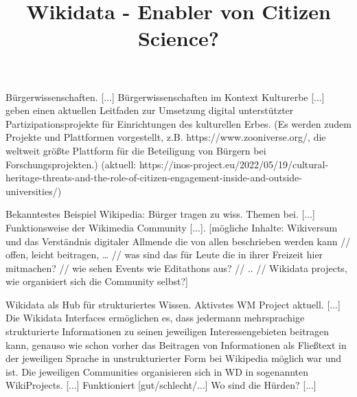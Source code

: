 \documentclass{article}
\begin{document}
\title{Wikidata - Enabler von Citizen Science?}

\maketitle





Bürgerwissenschaften. [...] Bürgerwissenschaften im Kontext Kulturerbe [...] \autocite{ridge_collective_2021} geben einen aktuellen Leitfaden zur Umsetzung digital unterstützter Partizipationsprojekte für Einrichtungen des kulturellen Erbes. (Es werden zudem Projekte und Plattformen vorgestellt, z.B. https://www.zooniverse.org/, die weltweit größte Plattform für die Beteiligung von Bürgern bei Forschungsprojekten.) (aktuell: https://inos-project.eu/2022/05/19/cultural-heritage-threats-and-the-role-of-citizen-engagement-inside-and-outside-universities/)


Bekanntestes Beispiel Wikipedia: Bürger tragen zu wiss. Themen bei. [...] Funktionsweise der Wikimedia Community [...]. [mögliche Inhalte: Wikiversum und das Verständnis digitaler Allmende die von allen beschrieben werden kann // offen, leicht beitragen, … // was sind das für Leute die in ihrer Freizeit hier mitmachen? // wie sehen Events wie Editathons aus? // .. // Wikidata projects, wie organisiert sich die Community selbst?]


Wikidata als Hub für strukturiertes Wissen. Aktivstes WM Project aktuell. [...] Die Wikidata Interfaces ermöglichen es, dass jedermann mehrsprachige strukturierte Informationen zu seinen jeweiligen Interessengebieten beitragen kann, genauso wie schon vorher das Beitragen von Informationen als Fließtext in der jeweiligen Sprache in unstrukturierter Form bei Wikipedia möglich war und ist. Die jeweiligen Communities organisieren sich in WD in sogenannten WikiProjects. [...] Funktioniert [gut/schlecht/...] Wo sind die Hürden? [...]





\printbibliography[title={Literaturverzeichnis}]
\end{document}
